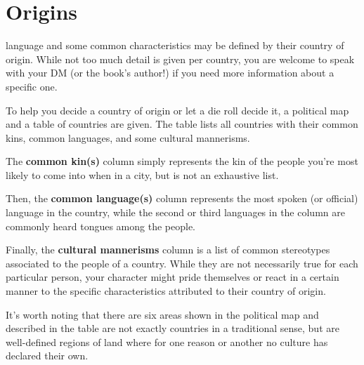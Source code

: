 \section{Origins} %
language and some common characteristics may be defined by their country of origin.
While not too much detail is given per country, you are welcome to speak with your DM (or the book's author!) if you need more information about a specific one.

To help you decide a country of origin or let a die roll decide it, a political map and a table of countries are given.
The table lists all countries with their common kins, common languages, and some cultural mannerisms.

The \textbf{common kin(s)} column simply represents the kin of the people you're most likely to come into when in a city, but is not an exhaustive list.

\thispagestyle{empty}


Then, the \textbf{common language(s)} column represents the most spoken (or official) language in the country, while the second or third languages in the column are commonly heard tongues among the people.

Finally, the \textbf{cultural mannerisms} column is a list of common stereotypes associated to the people of a country.
While they are not necessarily true for each particular person, your character might pride themselves or react in a certain manner to the specific characteristics attributed to their country of origin.

\newpage

It's worth noting that there are six areas shown in the political map and described in the table are not exactly countries in a traditional sense, but are well-defined regions of land where for one reason or another no culture has declared their own.

